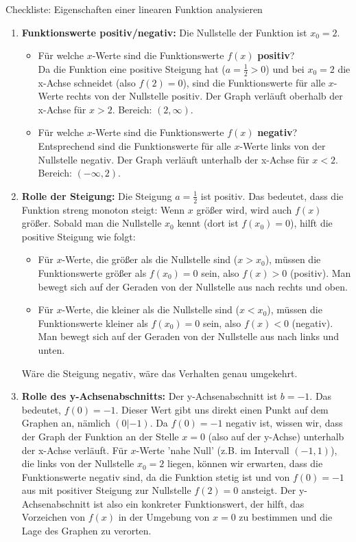 \begin{loesungsumgebung}{Checkliste: Eigenschaften einer linearen Funktion analysieren}
\begin{enumerate}[label=(\alph*)]
    \item \textbf{Funktionswerte positiv/negativ:}
    Die Nullstelle der Funktion ist $x_0=2$.
    \begin{itemize}
        \item Für welche $x$-Werte sind die Funktionswerte $f(x)$ \textbf{positiv}? \\
        Da die Funktion eine positive Steigung hat ($a=\frac{1}{2} > 0$) und bei $x_0=2$ die x-Achse schneidet (also $f(2)=0$), sind die Funktionswerte für alle $x$-Werte rechts von der Nullstelle positiv.
        Der Graph verläuft oberhalb der x-Achse für $x > 2$. Bereich: $(2, \infty)$.
        \item Für welche $x$-Werte sind die Funktionswerte $f(x)$ \textbf{negativ}? \\
        Entsprechend sind die Funktionswerte für alle $x$-Werte links von der Nullstelle negativ.
        Der Graph verläuft unterhalb der x-Achse für $x < 2$. Bereich: $(-\infty, 2)$.
    \end{itemize}

    \item \textbf{Rolle der Steigung:}
    Die Steigung $a = \frac{1}{2}$ ist positiv. Das bedeutet, dass die Funktion streng monoton steigt: Wenn $x$ größer wird, wird auch $f(x)$ größer.
    Sobald man die Nullstelle $x_0$ kennt (dort ist $f(x_0)=0$), hilft die positive Steigung wie folgt:
    \begin{itemize}
        \item Für $x$-Werte, die größer als die Nullstelle sind ($x > x_0$), müssen die Funktionswerte größer als $f(x_0)=0$ sein, also $f(x) > 0$ (positiv). Man bewegt sich auf der Geraden von der Nullstelle aus nach rechts und oben.
        \item Für $x$-Werte, die kleiner als die Nullstelle sind ($x < x_0$), müssen die Funktionswerte kleiner als $f(x_0)=0$ sein, also $f(x) < 0$ (negativ). Man bewegt sich auf der Geraden von der Nullstelle aus nach links und unten.
    \end{itemize}
    Wäre die Steigung negativ, wäre das Verhalten genau umgekehrt.

    \item \textbf{Rolle des y-Achsenabschnitts:}
    Der y-Achsenabschnitt ist $b=-1$. Das bedeutet, $f(0)=-1$. Dieser Wert gibt uns direkt einen Punkt auf dem Graphen an, nämlich $(0|-1)$.
    Da $f(0)=-1$ negativ ist, wissen wir, dass der Graph der Funktion an der Stelle $x=0$ (also auf der y-Achse) unterhalb der x-Achse verläuft.
    Für $x$-Werte 'nahe Null' (z.B. im Intervall $(-1,1)$), die links von der Nullstelle $x_0=2$ liegen, können wir erwarten, dass die Funktionswerte negativ sind, da die Funktion stetig ist und von $f(0)=-1$ aus mit positiver Steigung zur Nullstelle $f(2)=0$ ansteigt. Der y-Achsenabschnitt ist also ein konkreter Funktionswert, der hilft, das Vorzeichen von $f(x)$ in der Umgebung von $x=0$ zu bestimmen und die Lage des Graphen zu verorten.


\end{enumerate}
\end{loesungsumgebung}
